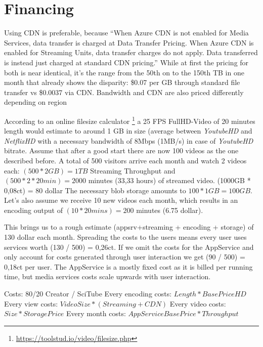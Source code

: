 \section{Financing}\label{sec:ch5}
Using CDN is preferable, because ``When Azure CDN is not enabled for Media Services, data transfer is charged at Data Transfer Pricing. When Azure CDN is enabled for Streaming Units, data transfer charges do not apply. Data transferred is instead just charged at standard CDN pricing.'' 
While at first the pricing for both is near identical, it's the range from the 50th on to the 150th TB in one month that already shows the disparity: \$0.07 per GB through standard file transfer vs  \$0.0037 via CDN.
Bandwidth and CDN are also priced differently depending on region

According to an online filesize calculator \footnote{\url{https://toolstud.io/video/filesize.php}} a 25 FPS FullHD-Video of 20 minutes length would estimate to around 1 GB in size (average between \textit{YoutubeHD} and \textit{NetflixHD} with a necessary bandwidth of 8Mbps (1MB/s) in case of \textit{YoutubeHD} bitrate.  %
Assume that after a good start there are now 100 videos as the one described before. A total of 500 visitors arrive each month and watch 2 videos each: $(500 \ast 2 GB) = 1TB$ Streaming Throughput and $(500 \ast 2 \ast 20 min)  = 2000$ minutes (33,33 hours) of streamed video. (1000GB * 0,08ct) = 80 dollar The necessary blob storage amounts to $100 \ast 1GB = 100GB$. Let's also assume we receive 10 new videos each month, which results in an encoding output of $(10 \ast 20 mins) = 200$ minutes (6.75 dollar).  

This brings us to a rough estimate (appsrv+streaming + encoding + storage) of 130 dollar each month. Spreading the costs to the users means every user uses services worth (130 / 500) = 0,26ct. If we omit the costs for the AppService and only account for costs generated through user interaction we get (90 / 500) = 0,18ct per user. The AppService is a mostly fixed cost as it is billed per running time, but media services costs scale upwards with user interaction.

Costs: 80/20 Creator / SciTube
Every encoding costs: $Length * BasePriceHD$
Every view costs: $VideoSize * (Streaming+CDN)$
Every video costs: $Size * StoragePrice$
Every month costs: $AppServiceBasePrice * Throughput$


